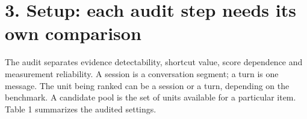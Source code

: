 \documentclass[11pt]{article}
\begin{document}
\label{main-3}

\section{3. Setup: each audit step needs its own comparison}\label{setup-each-audit-step-needs-its-own-comparison}

The audit separates evidence detectability, shortcut value, score dependence and measurement reliability. A session is a conversation segment; a turn is one message. The unit being ranked can be a session or a turn, depending on the benchmark. A candidate pool is the set of units available for a particular item. Table 1 summarizes the audited settings.

\begin{table}[tbp]

\caption*{\textbf{Table 1. Benchmark coverage.} This table covers eight benchmarks in all. Seven appear in the evidence audit, which has nine settings because BEAM has three scales. MemOps appears in the atlas only; the atlas replaces Persona\-Mem-v2 with MemOps. These are selected settings with tractable adapters, not a prevalence sample. Construction summaries, populations and adapters are in Appendices A, E and K.}

\small


\end{table}
\end{document}
